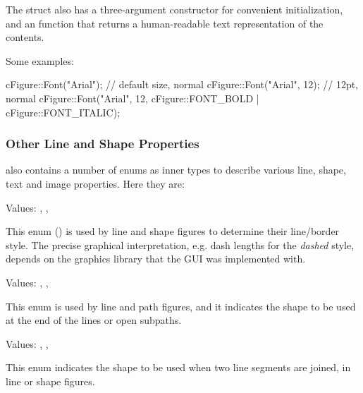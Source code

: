 The struct also has a three-argument constructor for convenient
initialization, and an  function that returns a human-readable
text representation of the contents.

Some examples:

\begin{cpp}
cFigure::Font("Arial");  // default size, normal
cFigure::Font("Arial", 12);  // 12pt, normal
cFigure::Font("Arial", 12, cFigure::FONT_BOLD | cFigure::FONT_ITALIC);
\end{cpp}


\subsubsection{Other Line and Shape Properties}
\label{sec:graphics:canvas-line-and-shape-properties}

 also contains a number of enums as inner types to describe
various line, shape, text and image properties. Here they are:


Values: , , 

This enum () is used by line and shape figures
to determine their line/border style. The precise graphical interpretation,
e.g. dash lengths for the \textit{dashed} style, depends on the graphics
library that the GUI was implemented with.


Values: , , 

This enum is used by line and path figures, and it indicates the shape to
be used at the end of the lines or open subpaths.

\begin{center}
\end{center}


Values: , , 

This enum indicates the shape to be used when two line segments are joined,
in line or shape figures.

\begin{center}
\end{center}


